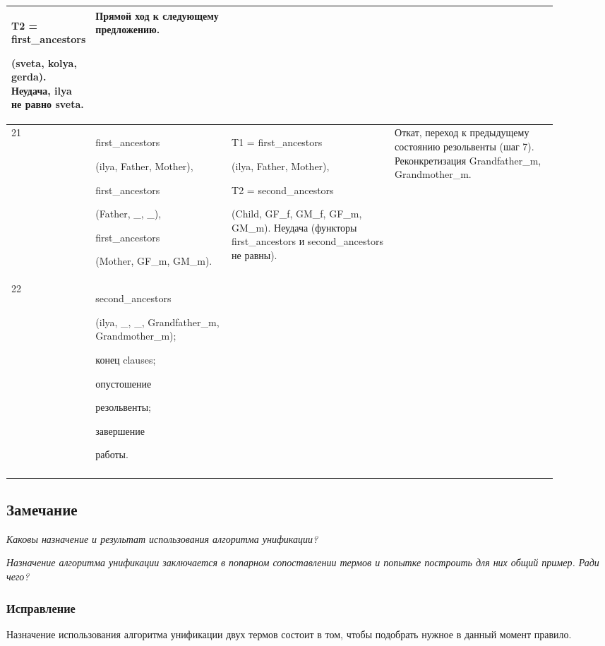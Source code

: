 \documentclass[a4paper,12pt]{article}
\begin{document}
\begin{center}
\begin{longtable}[h!]{|p{0.05\linewidth}|p{0.25\linewidth}|p{ 0.3\linewidth}|p{ 0.3\linewidth}|}
{				T2 = first\_ancestors
				
				(sveta, kolya, gerda). Неудача, ilya не равно sveta.} & {Прямой ход к следующему предложению.}\\
			\hline
			{21} & {first\_ancestors
				
				(ilya, Father, Mother),
				
				first\_ancestors
				
				(Father, \_, \_),
				
				first\_ancestors
				
				(Mother, GF\_m, GM\_m).} & {T1 = first\_ancestors
				
				(ilya, Father, Mother),
				
				T2 = second\_ancestors
				
				(Child, GF\_f, GM\_f, GF\_m, GM\_m). Неудача (функторы first\_ancestors и second\_ancestors не равны).} & {Откат, переход к предыдущему состоянию резольвенты (шаг 7). Реконкретизация Grandfather\_m, Grandmother\_m.}\\
			\hline
			{22} & {second\_ancestors
				
				(ilya, \_, \_, Grandfather\_m, Grandmother\_m);
				
				конец clauses;
				
				опустошение 
				
				резольвенты;
				
				завершение
				
				работы.} & {} & {}\\
			\hline
			\label{m2}
		\end{longtable}
	\end{center}
	
	\subsection*{Замечание}
	
	\textit{Каковы назначение и результат использования алгоритма унификации?}
	
	\textit{Назначение алгоритма унификации заключается в попарном сопоставлении термов и попытке построить для них общий пример. Ради чего?}
	
	\subsubsection*{Исправление}
	
	Назначение использования алгоритма унификации двух термов состоит в том, чтобы подобрать нужное в данный момент правило.
	
\end{document}
